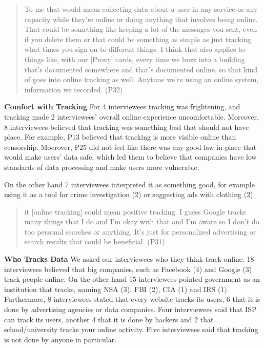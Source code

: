 \begin{quote}To me that would mean collecting data about a user in any service
or any capacity while they're online or doing anything that involves being
online. That could be something like keeping a lot of the messages you sent,
even if you delete them or that could be something as simple as just tracking
what times you sign on to different things. I think that also applies to
things like, with our [Proxy] cards, every time we buzz into a building that's
documented somewhere and that's documented online, so that kind of goes into
online tracking as well. Anytime we're using an online system, information we
recorded. (P32)\end{quote}



\textbf{Comfort with Tracking} For 4 interviewees tracking was frightening,
and tracking made 2 interviewees' overall online experience uncomfortable.
Moreover, 8 interviewees believed that tracking was something bad that should
not have place. For example, P13 believed that tracking is more visible online
than censorship.
Moerover, P25 did not feel like there was any good law in place that would
make users' data safe, which led them to believe that companies have low
standards of data processing and make users more vulnerable. 

On the other hand 7 interviewees interpreted it as something good, for example
using it as a tool for crime investigation (2) or suggesting ads with clothing
(2). 

\begin{quote} it [online tracking] could mean positive tracking. I guess
Google tracks many things that I do and I'm okay with that and I'm aware so I
don't do too personal searches or anything. It's just for personalized
advertising or search results that could be beneficial. (P31) \end{quote}


\textbf{Who Tracks Data} We asked our interviewees who they think track
online. 18 interviewees believed that big companies, such as Facebook (4) and
Google (3) track people online. On the other hand 15 interviewees pointed
government as an institution that tracks, naming NSA (3), FBI (2), CIA (1) and
IRS (1). Furthermore, 8 interviewees stated that every website tracks its
users, 6 that it is done by advertising agencies or data companies. Four
interviewees said that ISP can track its users, another 4 that it is done by
hackers and 2 that school/university tracks your online activity. Five
interviewees said that tracking is not done by anyone in particular.

